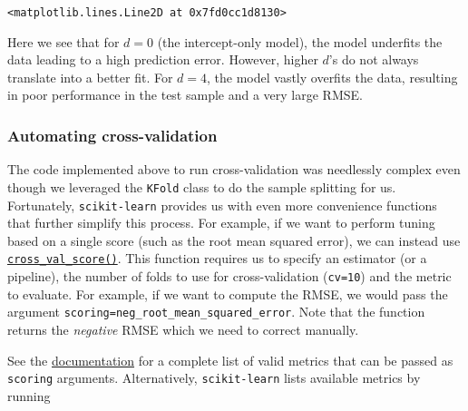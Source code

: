 \documentclass{scrartcl}
\makeatletter
\newcommand{\boxspacing}{\kern\kvtcb@left@rule\kern\kvtcb@boxsep}
\newcommand{\prompt}[4]{
        {\ttfamily\llap{{\color{#2}[#3]:\hspace{3pt}#4}}\vspace{-\baselineskip}}
    }
\makeatother
\begin{document}
            \begin{tcolorbox}[breakable, size=fbox, boxrule=.5pt, pad at break*=1mm, opacityfill=0]
\prompt{Out}{outcolor}{29}{\boxspacing}
\begin{Verbatim}[commandchars=\\\{\}]
<matplotlib.lines.Line2D at 0x7fd0cc1d8130>
\end{Verbatim}
\end{tcolorbox}
        
    \begin{center}
    \end{center}
    
    Here we see that for \(d=0\) (the intercept-only model), the model
underfits the data leading to a high prediction error. However, higher
\(d\)'s do not always translate into a better fit. For \(d = 4\), the
model vastly overfits the data, resulting in poor performance in the
test sample and a very large RMSE.

    \hypertarget{automating-cross-validation}{%
\subsubsection*{Automating
cross-validation}\label{automating-cross-validation}}

The code implemented above to run cross-validation was needlessly
complex even though we leveraged the \texttt{KFold} class to do the
sample splitting for us. Fortunately, \texttt{scikit-learn} provides us
with even more convenience functions that further simplify this process.
For example, if we want to perform tuning based on a single score (such
as the root mean squared error), we can instead use
\href{https://scikit-learn.org/stable/modules/generated/sklearn.model_selection.cross_val_score.html}{\texttt{cross\_val\_score()}}.
This function requires us to specify an estimator (or a pipeline), the
number of folds to use for cross-validation (\texttt{cv=10}) and the
metric to evaluate. For example, if we want to compute the RMSE, we
would pass the argument
\texttt{scoring=\textquotesingle{}neg\_root\_mean\_squared\_error\textquotesingle{}}.
Note that the function returns the \emph{negative} RMSE which we need to
correct manually.

See the
\href{https://scikit-learn.org/stable/modules/model_evaluation.html\#scoring-parameter}{documentation}
for a complete list of valid metrics that can be passed as
\texttt{scoring} arguments. Alternatively, \texttt{scikit-learn} lists
available metrics by running
\end{document}
